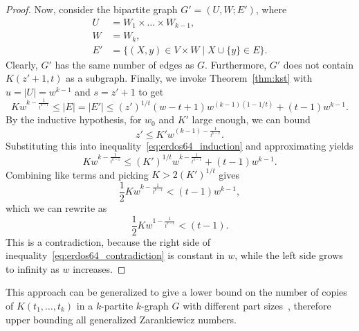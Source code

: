 \begin{theorem}
\begin{proof}
        Now, consider the bipartite graph $G' = (U, W; E')$, where
        \begin{align*}
            U &= W_1 \times \dots \times W_{k-1}, \\
            W &= W_k, \\
            E' &= \{(X, y) \in V \times W \mid X \cup \{y\} \in E\}.
        \end{align*}
        Clearly, $G'$ has the same number of edges as $G$.
        Furthermore, $G'$ does not contain $K(z' + 1, t)$ as a subgraph.
        Finally, we invoke Theorem~\ref{thm:kst} with
        ${u = |U| = w^{k-1}}$ and
        ${s = z' + 1}$ to get
        \begin{equation} \label{eq:erdos64_induction}
            K w^{k - \frac{1}{t^{k-1}}} \leq
            |E| = |E'| \leq
            (z')^{1 / t}(w - t + 1)w^{(k-1)(1 - 1 / t)} + (t - 1)w^{k-1}.
        \end{equation}
        By the inductive hypothesis, for $w_0$ and $K'$ large enough, we can bound
        \[
            z' \leq K' w^{(k - 1) - \frac{1}{t^{k-2}}}.
        \]
        Substituting this into inequality~\eqref{eq:erdos64_induction} and approximating yields
        \[
            K w^{k - \frac{1}{t^{k-1}}} \leq (K')^{1 / t} w^{k-\frac{1}{t^{k-1}}} + (t - 1)w^{k-1}.
        \]
        Combining like terms and picking $K > 2 (K')^{1 / t}$ gives
        \[
            \frac{1}{2}K w^{k - \frac{1}{t^{k-1}}} < (t - 1)w^{k-1},
        \]
        which we can rewrite as
        \begin{equation} \label{eq:erdos64_contradiction}
            \frac{1}{2}Kw^{1 - \frac{1}{t^{k-1}}} < (t - 1).
        \end{equation}
        This is a contradiction, because the right side of inequality~\eqref{eq:erdos64_contradiction}
        is constant in $w$, while the left side grows to infinity as $w$ increases.
    \end{proof}
\end{theorem}

This approach can be generalized to give a lower bound on the number of
copies of $K(t_1, \dots, t_k)$ in a $k$-partite $k$-graph $G$
with different part sizes~\cite{carvajal2024canonical},
therefore upper bounding all generalized Zarankiewicz numbers.


